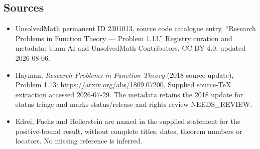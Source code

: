 \documentclass[11pt]{article}
\begin{document}
\subsection{Sources}
\begin{itemize}
\item UnsolvedMath permanent ID 2301013, source code catalogue entry, ``Research Problems in Function Theory --- Problem 1.13.'' Registry curation and metadata: Ulam AI and UnsolvedMath Contributors, CC BY 4.0; updated 2026-08-06.
\item Hayman, \emph{Research Problems in Function Theory} (2018 source update), Problem 1.13: \url{https://arxiv.org/abs/1809.07200}. Supplied source-TeX extraction accessed 2026-07-29. The metadata retains the 2018 update for status triage and marks status/release and rights review NEEDS\_REVIEW.
\item Edrei, Fuchs and Hellerstein are named in the supplied statement for the positive-bound result, without complete titles, dates, theorem numbers or locators. No missing reference is inferred.
\end{itemize}
\end{document}
